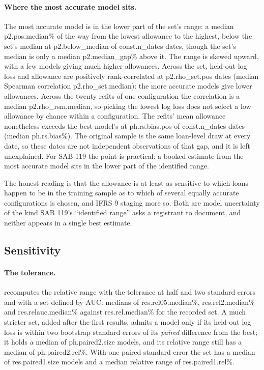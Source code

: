 \paragraph{Where the most accurate model sits.} The most accurate model is in
the lower part of the set's range: a median \num{p2.pos.median}\% of the way
from the lowest allowance to the highest, below the set's median at
\num{p2.below_median} of \num{const.n_dates} dates, though the set's median is
only a median \num{p2.median_gap}\% above it. The range is skewed upward, with a
few models giving much higher allowances. Across the set, held-out log loss
and allowance are positively rank-correlated at \num{p2.rho_set.pos} dates
(median Spearman correlation \num{p2.rho_set.median}): the more accurate
models give lower allowances. Across the twenty refits of one configuration
the correlation is a median \num{p2.rho_rsm.median}, so picking the lowest
log loss does not select a low allowance by chance within a configuration.
The refits' mean allowance nonetheless exceeds the best model's at
\num{ph.rs.bias.pos} of \num{const.n_dates} dates (median \num{ph.rs.bias}\%).
The original sample is the same loan-level draw at every date, so these
dates are not independent observations of that gap, and it is left
unexplained. For SAB 119 the point is practical: a booked estimate from the
most accurate model sits in the lower part of the identified range.

The honest reading is that the allowance is at least as sensitive to which
loans happen to be in the training sample as to which of several equally
accurate configurations is chosen, and IFRS 9 staging more so. Both are model
uncertainty of the kind SAB 119's ``identified range'' asks a registrant to
document, and neither appears in a single best estimate.

\subsection{Sensitivity}\label{sec:sensitivity}

\paragraph{The tolerance.}  recomputes the relative
range with the tolerance at half and two standard errors and with a set
defined by AUC: medians of \num{res.rel05.median}\%, \num{res.rel2.median}\% and
\num{res.relauc.median}\% against \num{res.rel.median}\% for the recorded set.
A much stricter set, added after the first results, admits a model only if
its held-out log loss is within two bootstrap standard errors of its
\emph{paired} difference from the best; it holds a median of
\num{ph.paired2.size} models, and its relative range still has a median of
\num{ph.paired2.rel}\%. With one paired standard error the set has a median of
\num{res.paired1.size} models and a median relative range of
\num{res.paired1.rel}\%.


